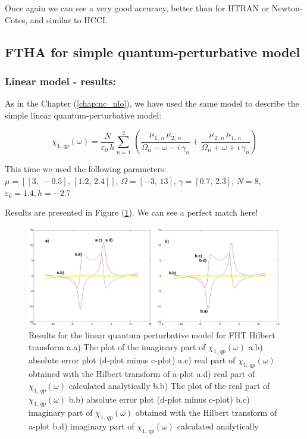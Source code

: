 \documentclass[12pt,twoside,a4paper]{article}
\numberwithin{equation}{subsection}
\numberwithin{figure}{subsection}
\begin{document}
Once again we can see a very good accuracy, better than for HTRAN or Newton-Cotes, and similar to HCCI.

\subsection{FTHA for simple quantum-perturbative model} \label{chap:hartley_quantum}

\subsubsection*{Linear model - results:}

As in the Chapter (\ref{chap:nc_nlo}), we have used the same model to describe the simple linear quantum-perturbative model: 

\begin{equation} \label{eq:fht_qp}
  {\chi_{1, \,qp}}(\omega ) = \frac {N}{\varepsilon_0\,h} \sum_{n=1}^{2}\,(\frac {{\mu_{1, \,n}}\,{ \mu_{2, \,n}}}{{\Omega_{n}}
  - \omega  - i\,{\gamma_{n}}} + \frac {{\mu_{2, \,n}}\,{\mu_{1, \,n}}}{{\Omega_{n}} + \omega + i\,{\gamma_{n}}})
\end{equation}

This time we used the following parameters: \\
$\mu = [[3, \, - 0.5], \,[1.2, \,2.4]]$, 
$\Omega =[ - 3, \,13]$, 
$\gamma =[0.7, \,2.3]$,  
$N=8$, 
${\varepsilon_{0}}=1.4, 
h= - 2.7$

Results are presented in Figure (\ref{fig:fht_qp1}). We can see a perfect match here!

\begin{figure}
  \includegraphics[width=150mm]{img/fht_qp1.png}
  \caption{Results for the linear quantum perturbative model for FHT Hilbert transform
    a.a) The plot of the imaginary part of ${\chi_{1, \,qp}}(\omega )$
    a.b) absolute error plot (d-plot minus c-plot) 
    a.c) real part of $\chi_{1, \, qp} (\omega )$ obtained with the Hilbert transform of a-plot 
    a.d) real part of $\chi_{1, \, qp} (\omega )$ calculated analytically 
    b.b) The plot of the real part of $ \chi_{1, \, qp} (\omega )$ 
    b.b) absolute error plot (d-plot minus c-plot) 
    b.c) imaginary part of $\chi_{1, \, qp} (\omega )$ obtained with the Hilbert transform of a-plot 
    b.d) imaginary part of $\chi_{1, \, qp} (\omega )$ calculated analytically  
    \label{fig:fht_qp1}
  }
\end{figure}
\end{document}
